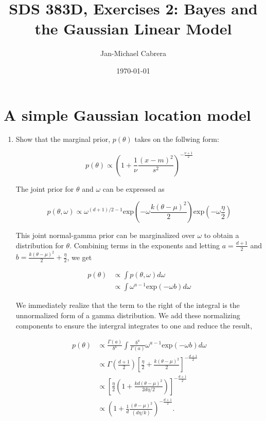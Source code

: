 \documentclass[10pt]{article}
\begin{document}
    \title{SDS 383D, Exercises 2: Bayes and the Gaussian Linear Model}
    \author{Jan-Michael Cabrera}
    \date{\today}
    \maketitle

    \section*{A simple Gaussian location model}

    \begin{enumerate}[label=(\Alph*)]
      \item Show that the marginal prior, $p(\theta)$ takes on the follwing form:

        $$ p(\theta) \propto \left ( 1 + \frac{1}{\nu} \frac{(x - m)^2}{s^2}\right )^{- \frac{\nu + 1}{2}}$$

        The joint prior for $\theta$ and $\omega$ can be expressed as

        $$p(\theta, \omega) \propto \omega^{(d+1)/2 - 1} \text{exp}\left( -\omega \frac{k (\theta - \mu)^2}{2}\right ) \text{exp}\left ( -\omega \frac{\eta}{2}\right)$$

        This joint normal-gamma prior can be marginalized over $\omega$ to obtain a distribution for $\theta$. Combining terms in the exponents and letting $a = \frac{d+1}{2}$ and $b = \frac{k (\theta - \mu)^2}{2} + \frac{\eta}{2}$, we get

        \begin{align*}
          p(\theta) &\propto \int p(\theta, \omega) d \omega \\
          & \propto \int \omega^{a-1} \text{exp}(- \omega b) d\omega
        \end{align*}
        
        We immediately realize that the term to the right of the integral is the unnormalized form of a gamma distribution. We add these normalizing components to ensure the intergral integrates to one and reduce the result,

        \begin{align*}
          p(\theta) & \propto \frac{\Gamma(a)}{b^a} \int \frac{b^a}{\Gamma(a)} \omega^{a-1} \text{exp}(- \omega b) d\omega \\
          & \propto \Gamma \left ( \frac{d+1}{2} \right) \left [ \frac{\eta}{2} + \frac{k (\theta - \mu)^2}{2}\right]^{- \frac{d+1}{2}} \\
          & \propto \left [ \frac{\eta}{2} \left (1 + \frac{kd (\theta - \mu)^2}{2 d \eta/2} \right )\right]^{- \frac{d+1}{2}} \\
          & \propto \left ( 1 + \frac{1}{d} \frac{(\theta - \mu)^2}{(d \eta/ k)}\right)^{- \frac{d+1}{2}}.
        \end{align*}


\end{enumerate}
\end{document}
